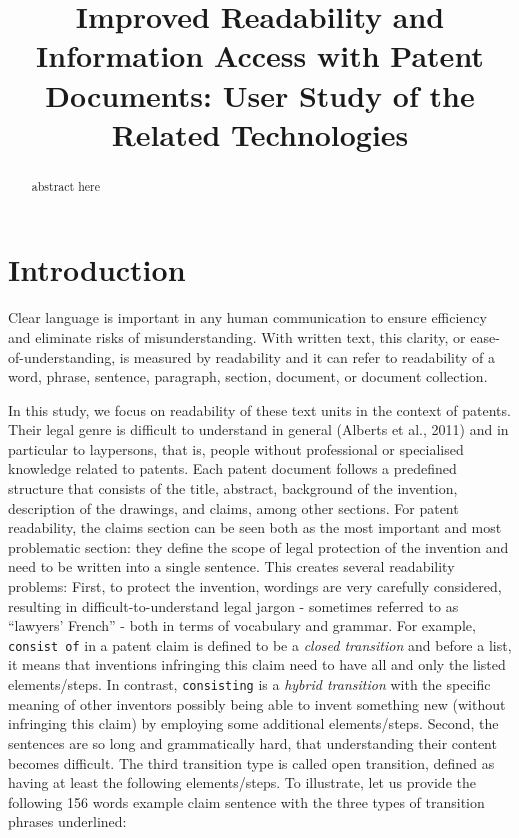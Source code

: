\documentclass[11pt]{article}
\title{Improved Readability and Information Access with Patent Documents: User Study of the Related Technologies}
\begin{document}
\maketitle

\begin{abstract}   
abstract here
\end{abstract}



\section{Introduction}

Clear language is important in any human communication to ensure efficiency and eliminate risks of misunderstanding. 
With written text, this clarity, or ease-of-understanding,  is measured by readability and it can refer to readability of a word, phrase, sentence, paragraph, section, document, or document collection. 

In this study, we focus on readability of these text units in the context of patents. Their legal genre is difficult to understand in general  (Alberts et al., 2011) and in particular to laypersons, that is, people without professional or specialised knowledge related to patents. Each patent document follows a predefined structure that consists of the title, abstract, background of the invention, description of the drawings, and claims, among other sections. 
For patent readability, the claims section can be seen both as the most important and most problematic section: they define the scope of legal protection of the invention and need to be written into a single sentence. This creates several readability problems: First, to protect the invention, wordings are very carefully considered, resulting in difficult-to-understand legal jargon - sometimes referred to as ``lawyers’ French'' - both in terms of vocabulary and grammar. 
For example, \texttt{consist of} in a patent claim is defined to be a \textit{closed transition} and before a list, it means that inventions infringing this claim need to have all and only the listed elements/steps. In contrast, \texttt{consisting} is a \textit{hybrid transition} with the specific meaning of other inventors possibly being able to invent something new (without infringing this claim) by employing some additional elements/steps. Second, the sentences are so long and grammatically hard, that understanding their content becomes difficult. The third transition type is called open transition, defined as having at least the following elements/steps. To illustrate, let us provide the following 156 words example claim sentence with the three types of transition phrases underlined: 
\end{document}
